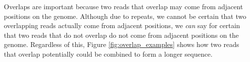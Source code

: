 \documentclass[10pt]{article}
\newcommand{\ReadArrowType}{latex}
\newcommand{\Figure}[1]{Figure \ref{#1}}
\begin{document}



Overlaps are important because two reads that overlap may come from adjacent
positions on the genome.  Although due to repeats, we cannot be certain that two
overlapping reads actually come from adjacent positions, we {\em can} say for
certain that two reads that do not overlap do not come from adjacent positions
on the genome.  Regardless of this, \Figure{fig:overlap_examples} shows how two
reads that overlap potentially could be combined to form a longer sequence.
\end{document}
